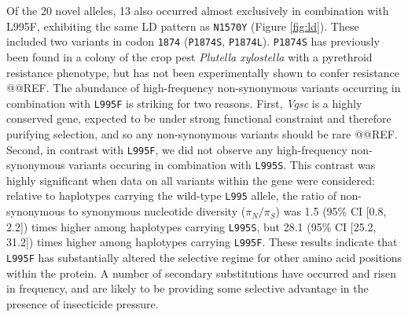 \documentclass[a4paper,11pt,abstracton,hidelinks]{scrartcl}
\begin{document}
%
Of the 20 novel alleles, 13 also occurred almost exclusively in combination with L995F, exhibiting the same LD pattern as \texttt{N1570Y} (Figure \ref{fig:ld}).
%
These included two variants in codon \texttt{1874} (\texttt{P1874S}, \texttt{P1874L}).
%
\texttt{P1874S} has previously been found in a colony of the crop pest \textit{Plutella xylostella} with a pyrethroid resistance phenotype, but has not been experimentally shown to confer resistance @@REF.
%
The abundance of high-frequency non-synonymous variants occurring in combination with \texttt{L995F} is striking for two reasons.
%
First, \textit{Vgsc} is a highly conserved gene, expected to be under strong functional constraint and therefore purifying selection, and so any non-synonymous variants should be rare @@REF.
%
Second, in contrast with \texttt{L995F}, we did not observe any high-frequency non-synonymous variants occuring in combination with \texttt{L995S}.
%
This contrast was highly significant when data on all variants within the gene were considered: relative to haplotypes carrying the wild-type \texttt{L995} allele, the ratio of non-synonymous to synonymous nucleotide diversity ($\pi_{N}/\pi_{S}$) was 1.5 (95\% CI [0.8, 2.2]) times higher among haplotypes carrying \texttt{L995S}, but 28.1 (95\% CI [25.2, 31.2]) times higher among haplotypes carrying \texttt{L995F}.
%
These results indicate that \texttt{L995F} has substantially altered the selective regime for other amino acid positions within the protein.
%
A number of secondary substitutions have occurred and risen in frequency, and are likely to be providing some selective advantage in the presence of insecticide pressure.
\end{document}
